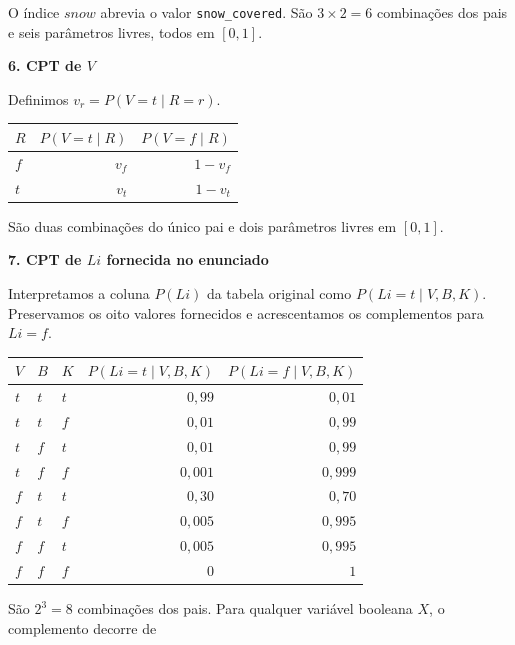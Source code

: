 \documentclass[11pt,a4paper]{article}
\newcommand{\subtitulo}[1]{\par\medskip\textbf{\textcolor{accent}{#1}}\par}
\begin{document}
O índice \(snow\) abrevia o valor \texttt{snow\_covered}. São \(3\times2=6\) combinações dos pais e seis parâmetros livres, todos em \([0,1]\).

\subtitulo{\texorpdfstring{6. CPT de \(V\)}{6. CPT de V}}\label{cpt-de-v}

Definimos \(v_r=P(V=t\mid R=r)\).

{\def\LTcaptype{none} %
\begin{longtable}[]{@{}lrr@{}}
\toprule\noalign{}
\(R\) & \(P(V=t\mid R)\) & \(P(V=f\mid R)\) \\
\midrule\noalign{}
\endhead
\bottomrule\noalign{}
\endlastfoot
\(f\) & \(v_f\) & \(1-v_f\) \\
\(t\) & \(v_t\) & \(1-v_t\) \\
\end{longtable}
}

São duas combinações do único pai e dois parâmetros livres em \([0,1]\).

\subtitulo{\texorpdfstring{7. CPT de \(Li\) fornecida no enunciado}{7. CPT de Li fornecida no enunciado}}\label{cpt-de-li-fornecida-no-enunciado}

Interpretamos a coluna \(P(Li)\) da tabela original como \(P(Li=t\mid V,B,K)\). Preservamos os oito valores fornecidos e acrescentamos os complementos para \(Li=f\).

{\def\LTcaptype{none} %
\begin{longtable}[]{@{}lllrr@{}}
\toprule\noalign{}
\(V\) & \(B\) & \(K\) & \(P(Li=t\mid V,B,K)\) & \(P(Li=f\mid V,B,K)\) \\
\midrule\noalign{}
\endhead
\bottomrule\noalign{}
\endlastfoot
\(t\) & \(t\) & \(t\) & \(0{,}99\) & \(0{,}01\) \\
\(t\) & \(t\) & \(f\) & \(0{,}01\) & \(0{,}99\) \\
\(t\) & \(f\) & \(t\) & \(0{,}01\) & \(0{,}99\) \\
\(t\) & \(f\) & \(f\) & \(0{,}001\) & \(0{,}999\) \\
\(f\) & \(t\) & \(t\) & \(0{,}30\) & \(0{,}70\) \\
\(f\) & \(t\) & \(f\) & \(0{,}005\) & \(0{,}995\) \\
\(f\) & \(f\) & \(t\) & \(0{,}005\) & \(0{,}995\) \\
\(f\) & \(f\) & \(f\) & \(0\) & \(1\) \\
\end{longtable}
}

São \(2^3=8\) combinações dos pais. Para qualquer variável booleana \(X\), o complemento decorre de
\end{document}
